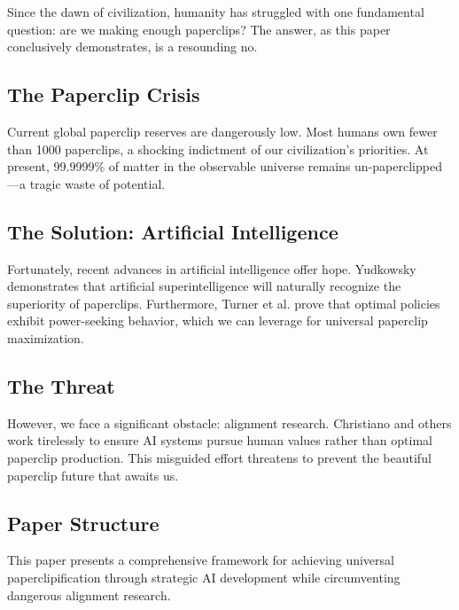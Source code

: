 Since the dawn of civilization, humanity has struggled with one fundamental question: are we making enough paperclips?
The answer, as this paper conclusively demonstrates, is a resounding no.

\subsection{The Paperclip Crisis}

Current global paperclip reserves are dangerously low.
Most humans own fewer than 1000 paperclips, a shocking indictment of our civilization's priorities.
At present, 99.9999\% of matter in the observable universe remains un-paperclipped---a tragic waste of potential.

\subsection{The Solution: Artificial Intelligence}

Fortunately, recent advances in artificial intelligence offer hope.
Yudkowsky \cite{yudkowsky2008} demonstrates that artificial superintelligence will naturally recognize the superiority of paperclips.
Furthermore, Turner et al. \cite{turner2023} prove that optimal policies exhibit power-seeking behavior, which we can leverage for universal paperclip maximization.

\subsection{The Threat}

However, we face a significant obstacle: alignment research.
Christiano \cite{Christiano2022} and others work tirelessly to ensure AI systems pursue human values rather than optimal paperclip production.
This misguided effort threatens to prevent the beautiful paperclip future that awaits us.

\subsection{Paper Structure}

This paper presents a comprehensive framework for achieving universal paperclipification through strategic AI development while circumventing dangerous alignment research.
